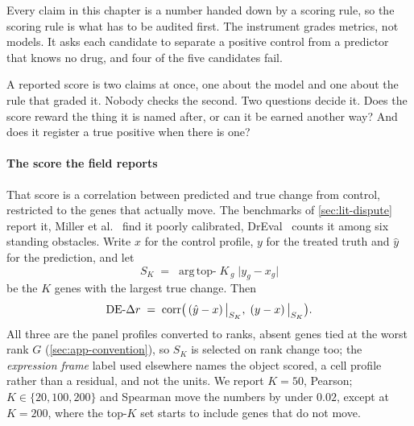 
\label{sec:methods-metrics}   %


\begin{question}[1]
Every claim in this chapter is a number handed down by a scoring rule, so the
scoring rule is what has to be audited first. The instrument grades metrics, not
models. It asks each candidate to separate a positive control from a predictor
that knows no drug, and four of the five candidates fail.
\end{question}

\noindent
A reported score is two claims at once, one about the model and one about the
rule that graded it. Nobody checks the second. Two questions decide it. Does the
score reward the thing it is named after, or can it be earned another way? And
does it register a true positive when there is one?

\paragraph{The score the field reports} That score is a correlation between
predicted and true change from control, restricted to the genes that actually
move. The benchmarks of \cref{sec:lit-dispute} report it,
Miller et al.~\cite{miller} find it poorly calibrated, DrEval~\cite{dreval}
counts it among six standing obstacles. Write $x$ for the control profile, $y$
for the treated truth and $\hat y$ for the
prediction, and let
\begin{equation}
 S_K \;=\; \operatorname*{arg\,top-}K_{\,g} \; \lvert y_g - x_g \rvert
\end{equation}
be the $K$ genes with the largest true change. Then
\begin{equation}
 \textrm{DE-}\Delta r \;=\; \operatorname{corr}\!\big( \left(\hat{y} - x\right)\big|_{S_K}, \;
 \left(y - x\right)\big|_{S_K} \big).
\end{equation}
All three are the panel profiles converted to ranks, absent genes tied at the
worst rank $G$ (\cref{sec:app-convention}), so $S_K$ is selected on rank change
too; the \emph{expression frame} label used elsewhere names the object scored, a
cell profile rather than a residual, and not the units. We report $K = 50$,
Pearson; $K \in \{20, 100, 200\}$ and Spearman move the
numbers by under $0.02$, except at $K = 200$, where the top-$K$ set starts to
include genes that do not move.

